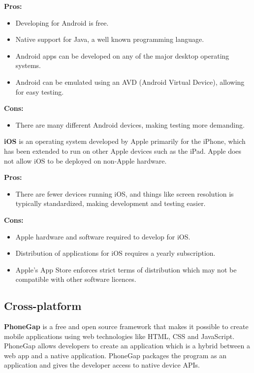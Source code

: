 \indent
  {\bf Pros:}
  \begin{itemize}
    \item Developing for Android is free.
    \item Native support for Java, a well known programming language.
    \item Android apps can be developed on any of the major desktop operating
          systems.
    \item Android can be emulated using an AVD (Android Virtual Device),
          allowing for easy testing.
  \end{itemize}

\indent
  {\bf Cons:}
  \begin{itemize}
    \item There are many different Android devices, making testing more
          demanding.
  \end{itemize}

\noindent
{\bf iOS} is an operating system developed by Apple primarily for the iPhone,
which has been extended to run on other Apple devices such as the iPad. Apple
does not allow iOS to be deployed on non-Apple hardware. \cite{ios}

\indent
  {\bf Pros:}
  \begin{itemize}
    \item There are fewer devices running iOS, and things like screen
          resolution is typically standardized, making development and testing
          easier.
  \end{itemize}

\indent
  {\bf Cons:}
  \begin{itemize}
    \item Apple hardware and software required to develop for iOS.
    \item Distribution of applications for iOS requires a yearly subscription. \cite{iosCost}
    \item Apple's App Store enforces strict terms of distribution which may not
          be compatible with other software licences.
  \end{itemize}


\subsection{Cross-platform}
    {\bf PhoneGap} is a free and open source framework that makes it possible
    to create mobile applications using web technologies like HTML, CSS and
    JavaScript. PhoneGap allows developers to create an application which is a
    hybrid between a web app and a native application. PhoneGap packages the
    program as an application and gives the developer access to native device APIs.
    \cite{phonegapFAQ}

